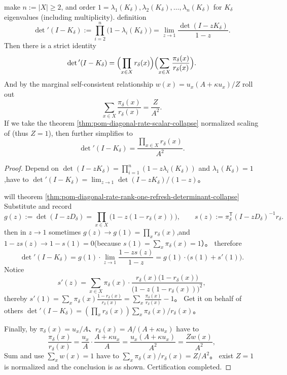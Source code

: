 \begin{corollary}\label{cor:pom-diagonal-rate-rank-one-refresh-detprime}
make \(n:=|X|\ge 2\), and order \(1=\lambda_1(K_\delta),\lambda_2(K_\delta),\dots,\lambda_n(K_\delta)\) for \(K_\delta\) eigenvalues ​​(including multiplicity).
definition
\[
\det{}'(I-K_\delta):=\prod_{i=2}^{n}\bigl(1-\lambda_i(K_\delta)\bigr)
=\lim_{z\to 1}\frac{\det(I-zK_\delta)}{1-z}.
\]
Then there is a strict identity
\[
\det{}'(I-K_\delta)
=\Bigl(\prod_{x\in X}r_\delta(x)\Bigr)\Bigl(\sum_{x\in X}\frac{\pi_\delta(x)}{r_\delta(x)}\Bigr).
\]
And by the marginal self-consistent relationship \(w(x)=u_x(A+\kappa u_x)/Z\) roll out
\[
\sum_{x\in X}\frac{\pi_\delta(x)}{r_\delta(x)}=\frac{Z}{A^2}.
\]
If we take the theorem \ref{thm:pom-diagonal-rate-scalar-collapse} normalized scaling of (thus \(Z=1\)), then further simplifies to
\[
\det{}'(I-K_\delta)=\frac{\prod_{x\in X}r_\delta(x)}{A^2}.
\]
\end{corollary}
\begin{proof}
Depend on \(\det(I-zK_\delta)=\prod_{i=1}^{n}(1-z\lambda_i(K_\delta))\) and \(\lambda_1(K_\delta)=1\),have to
\(
\det{}'(I-K_\delta)=\lim_{z\to 1}\det(I-zK_\delta)/(1-z)
\)。
\par
will theorem \ref{thm:pom-diagonal-rate-rank-one-refresh-determinant-collapse} Substitute and record
\[
g(z):=\det(I-zD_\delta)=\prod_{x\in X}\bigl(1-z(1-r_\delta(x))\bigr),
\qquad
s(z):=\pi_\delta^{\mathsf T}(I-zD_\delta)^{-1}r_\delta.
\]
then in \(z\to 1\) sometimes \(g(z)\to g(1)=\prod_x r_\delta(x)\),and
\(
1-zs(z)\to 1-s(1)=0
\)(because \(s(1)=\sum_x\pi_\delta(x)=1\)）。
therefore
\[
\det{}'(I-K_\delta)=g(1)\cdot\lim_{z\to 1}\frac{1-zs(z)}{1-z}
=g(1)\cdot\bigl(s(1)+s'(1)\bigr).
\]
Notice
\[
s'(z)=\sum_{x\in X}\pi_\delta(x)\cdot
\frac{r_\delta(x)\bigl(1-r_\delta(x)\bigr)}{\bigl(1-z(1-r_\delta(x))\bigr)^2},
\]
thereby
\(
s'(1)=\sum_x\pi_\delta(x)\frac{1-r_\delta(x)}{r_\delta(x)}
=\sum_x\frac{\pi_\delta(x)}{r_\delta(x)}-1
\)。
Get it on behalf of others
\(
\det{}'(I-K_\delta)
=(\prod_x r_\delta(x))\sum_x \pi_\delta(x)/r_\delta(x)
\)。
\par
Finally, by \(\pi_\delta(x)=u_x/A\)、\(r_\delta(x)=A/(A+\kappa u_x)\) have to
\[
\frac{\pi_\delta(x)}{r_\delta(x)}
=\frac{u_x}{A}\cdot \frac{A+\kappa u_x}{A}
=\frac{u_x(A+\kappa u_x)}{A^2}
=\frac{Zw(x)}{A^2},
\]
Sum and use \(\sum_x w(x)=1\) have to \(\sum_x\pi_\delta(x)/r_\delta(x)=Z/A^2\)。
exist \(Z=1\) is normalized and the conclusion is as shown. Certification completed.
\end{proof}

